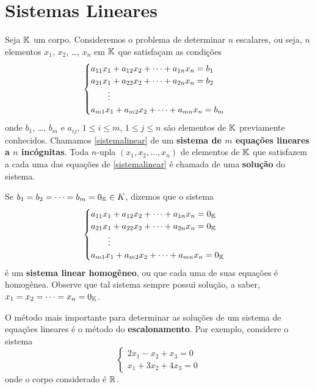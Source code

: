 \section{Sistemas Lineares}\label{ssub:sistemas_lineares}
Seja $\mathbb{K}$ um corpo. Consideremos o problema de determinar $n$ escalares, ou seja, $n$ elementos $x_1$, $x_2$, \dots, $x_n$ em $\mathbb{K}$ que satisfa\c{c}am as condi\c{c}\~oes
\begin{equation}\label{sistemalinear}\index{Sistema Linear}
\begin{cases}
a_{11}x_1 + a_{12}x_2 + \cdots + a_{1n}x_n = b_1\\
a_{21}x_1 + a_{22}x_2 + \cdots + a_{2n}x_n = b_2\\
\qquad \vdots\\
a_{m1}x_1 + a_{m2}x_2 + \cdots + a_{mn}x_n = b_m\\
\end{cases}
\end{equation}
onde $b_1$, \dots, $b_m$ e $a_{ij}$, $1 \le i \le m$, $1 \le j \le n$ s\~ao elementos de $\mathbb{K}$ previamente conhecidos. Chamamos \eqref{sistemalinear} de um \textbf{sistema de $m$ equa\c{c}\~oes lineares a $n$ inc\'ognitas}. Toda $n$-upla $(x_1, x_2, \dots, x_n)$ de elementos de $\mathbb{K}$ que satisfazem a cada uma das equa\c{c}\~oes de \eqref{sistemalinear} \'e chamada de uma \textbf{solu\c{c}\~ao} do sistema. 

Se $b_1 = b_2 = \cdots = b_m = 0_{\mathbb{K}} \in K$, dizemos que o sistema
\begin{equation}\label{sistemalinearhomogeneo}\index{Sistema Linear}
\begin{cases}
a_{11}x_1 + a_{12}x_2 + \cdots + a_{1n}x_n = 0_\cp{K}\\
a_{21}x_1 + a_{22}x_2 + \cdots + a_{2n}x_n = 0_\cp{K}\\
\qquad \vdots\\
a_{m1}x_1 + a_{m2}x_2 + \cdots + a_{mn}x_n = 0_\cp{K}\\
\end{cases}
\end{equation}
\'e um \textbf{sistema linear homog\^eneo}, ou que cada uma de suas equa\c{c}\~oes \'e homog\^enea. Observe que tal sistema sempre possui solu\c{c}\~ao, a saber, $x_1 = x_2 = \cdots = x_n = 0_{\mathbb{K}}$.

O m\'etodo mais importante para determinar as solu\c{c}\~oes de um sistema de equa\c{c}\~oes lineares \'e o m\'etodo do \textbf{escalonamento}. Por exemplo, considere o sistema
\begin{equation}\label{exemploplo1}
\begin{cases}
2x_1 - x_2 + x_3 = 0\\
x_1 + 3x_2 + 4x_ 3 = 0
\end{cases}
\end{equation}
onde o corpo considerado \'e $\mathbb{R}$.

